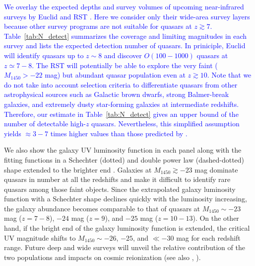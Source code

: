 \documentclass[twocolumn, twocolappendix]{aastex63}
\newcommand{\Muv}{M_{1450}}
\newcommand{\blue}[1]{\textcolor{blue}{ #1}}
\begin{document}
\begin{CJK*}{UTF8}{gbsn}
\blue{
We overlay the expected depths and survey volumes of upcoming near-infrared surveys by
Euclid \citep{2011arXiv1110.3193L} and RST \citep{2019arXiv190205569A}.
Here we consider only their wide-area survey layers because other survey programs are not suitable for quasars at $z\gtrsim 7$.
Table~\ref{tab:N_detect} summarizes the coverage and limiting magnitudes in each survey
and lists the expected detection number of quasars.
In priniciple, Euclid will identify quasars up to $z\sim 8$ and discover $O(100-1000)$ quasars at $z\simeq 7-8$.
The RST will potentially be able to explore the very faint ($\Muv>-22$ mag) but abundant quasar population even at $z\gtrsim 10$. 
Note that we do not take into account selection criteria to differentiate quasars from other astrophysical sources such
as Galactic brown dwarfs, strong Balmer-break galaxies, and extremely dusty star-forming galaxies at intermediate redshifts.
Therefore, our estimate in Table~\ref{tab:N_detect} gives an upper bound of the number of detectable high-$z$ quasars.
Nevertheless, this simplified assumption yields $\approx 3-7$ times higher values than those predicted by \citet{2019A&A...631A..85E}.
}



We also show the galaxy UV luminosity function in each panel
along with the fitting functions in a Schechter (dotted) and double power law (dashed-dotted) shape extended to the brighter end
\citep{2013MNRAS.432.2696M, 2016ApJ...819..129O, 2018ApJ...867..150M, 2019ApJ...883...99S, 2020MNRAS.493.2059B,
2021AJ....162...47B, 2022arXiv220712356D,
2022ApJS..259...20H, Harikane_2022b, Harikane_2022c, 2022arXiv220709434N}.
Galaxies at $\Muv\gtrsim -23$ mag dominate quasars in number at all the redshifts and make it 
difficult to identify rare quasars among those faint objects.
Since the extrapolated galaxy luminosity function with a Schechter shape declines quickly with the luminosity increasing,
the galaxy abundance becomes comparable to that of quasars at $\Muv \sim -23$ mag ($z=7-8$), $-24$ mag ($z=9$), and $-25$ mag ($z=10-13$).
On the other hand, if the bright end of the galaxy luminosity function is extended, the critical UV magnitude shifts to
$\Muv\sim-26$, $-25$, and $\ll -30$ mag for each redshift range.
Future deep and wide surveys will unveil the relative contribution of the two populations and impacts on cosmic reionization
(see also , \citealt{2022NatAs...6..850J}).




\end{CJK*}
\end{document}
